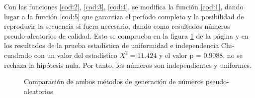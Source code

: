 \documentclass{article}
\begin{document}
Con las funciones \ref{cod:2}, \ref{cod:3}, \ref{cod:4}, se modifica la función \ref{cod:1}, dando lugar a la función \ref{cod:5} que garantiza el período completo y la posibilidad de reproducir la secuencia si fuera necesario, dando como resultados números pseudo-aleatorios de calidad. Esto se comprueba en la figura \ref{fig:1} de la página \pageref{fig:1} y en los resultados de la prueba estadística de uniformidad e independencia Chi-cuadrado con un valor del estadístico $X^{2}=11.424$ y el valor p = $0.9088$, no se rechaza la hipótesis nula. Por tanto, los números son independientes y uniformes. 
\begin{center}

\label{cod:5}
\end{center}
\begin{figure}
\centering
{}
\vspace{-0.3cm}
\centering
{}
\caption{Comparación de ambos métodos de generación de números pseudo-aleatorios}
\label{fig:1} 
\end{figure}
\end{document}

